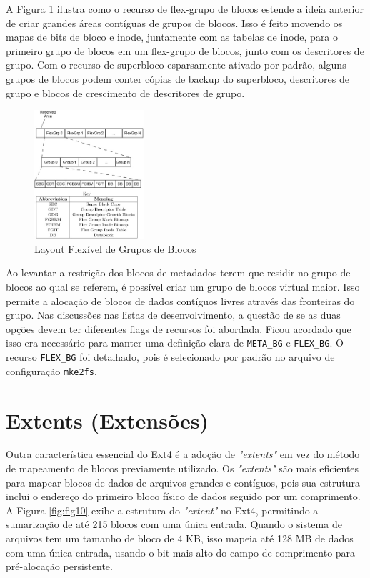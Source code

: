 \documentclass[
	12pt,				%
	openright,			%
	oneside,			%
	a4paper,			%
	chapter=TITLE,		%
	english,			%
	french,				%
	spanish,			%
	brazil				%
	]{abntex2}
\theoremstyle{definition}
\begin{document}
A Figura \ref{fig:9} ilustra como o recurso de flex-grupo de blocos estende a ideia anterior 
de criar grandes áreas contíguas de grupos de blocos. Isso é feito movendo os mapas de bits de bloco e 
inode, juntamente com as tabelas de inode, para o primeiro grupo de blocos em um flex-grupo de blocos, 
junto com os descritores de grupo. Com o recurso de superbloco esparsamente ativado por padrão, alguns
grupos de blocos podem conter cópias de backup do superbloco, descritores de grupo e blocos de 
crescimento de descritores de grupo.

\begin{figure}[H]
	\centering
	\includegraphics[width=0.36\textwidth]{fig9.jpg}
	\caption{Layout Flexível de Grupos de Blocos}
	\label{fig:9}
\end{figure}

Ao levantar a restrição dos blocos de metadados terem que residir no grupo de blocos ao qual se 
referem, é possível criar um grupo de blocos virtual maior. Isso permite a alocação de blocos de
dados contíguos livres através das fronteiras do grupo. Nas discussões nas listas de desenvolvimento, 
a questão de se as duas opções devem ter diferentes flags de recursos foi abordada. Ficou acordado 
que isso era necessário para manter uma definição clara de \texttt{META\_BG} e \texttt{FLEX\_BG}. 
O recurso \texttt{FLEX\_BG} foi detalhado, pois é selecionado por padrão no arquivo de configuração \texttt{mke2fs}.

\section{Extents (Extensões)}

Outra característica essencial do Ext4 é a adoção de \textit{"extents"} em vez do método de mapeamento 
de blocos previamente utilizado. Os \textit{"extents"} são mais eficientes 
para mapear blocos de dados de arquivos grandes e contíguos, pois sua estrutura inclui o endereço do 
primeiro bloco físico de dados seguido por um comprimento. A Figura \ref{fig:fig10} exibe a estrutura 
do \textit{"extent"} no Ext4, permitindo a sumarização de até 215 blocos com uma única entrada. 
Quando o sistema de arquivos tem um tamanho de bloco de 4 KB, isso mapeia até 128 MB de dados 
com uma única entrada, usando o bit mais alto do campo de comprimento para pré-alocação persistente.
\end{document}

